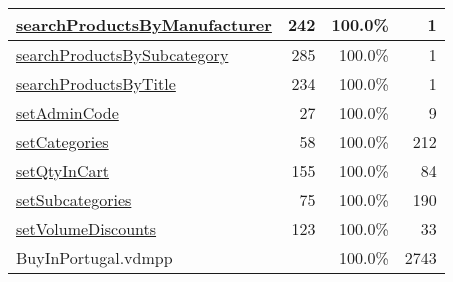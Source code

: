 \begin{longtable}{|l|r|r|r|}
\hyperref[searchProductsByManufacturer:242]{searchProductsByManufacturer} & 242&100.0\% & 1 \\
\hline
\hyperref[searchProductsBySubcategory:285]{searchProductsBySubcategory} & 285&100.0\% & 1 \\
\hline
\hyperref[searchProductsByTitle:234]{searchProductsByTitle} & 234&100.0\% & 1 \\
\hline
\hyperref[setAdminCode:27]{setAdminCode} & 27&100.0\% & 9 \\
\hline
\hyperref[setCategories:58]{setCategories} & 58&100.0\% & 212 \\
\hline
\hyperref[setQtyInCart:155]{setQtyInCart} & 155&100.0\% & 84 \\
\hline
\hyperref[setSubcategories:75]{setSubcategories} & 75&100.0\% & 190 \\
\hline
\hyperref[setVolumeDiscounts:123]{setVolumeDiscounts} & 123&100.0\% & 33 \\
\hline
\hline
BuyInPortugal.vdmpp & & 100.0\% & 2743 \\
\hline
\end{longtable}

